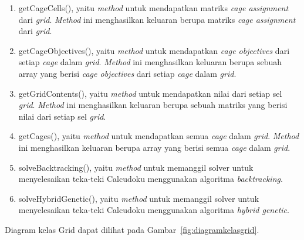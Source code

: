\begin{enumerate}
\item getCageCells(), yaitu \textit{method} untuk mendapatkan matriks \textit{cage assignment} dari \textit{grid}. \textit{Method} ini menghasilkan keluaran berupa matriks \textit{cage assignment} dari \textit{grid}.
\item getCageObjectives(), yaitu \textit{method} untuk mendapatkan \textit{cage objectives} dari setiap \textit{cage} dalam \textit{grid}. \textit{Method} ini menghasilkan keluaran berupa sebuah array yang berisi \textit{cage objectives} dari setiap \textit{cage} dalam \textit{grid}.
\item getGridContents(), yaitu \textit{method} untuk mendapatkan nilai dari setiap sel \textit{grid}. \textit{Method} ini menghasilkan keluaran berupa sebuah matriks yang berisi nilai dari setiap sel \textit{grid}.
\item getCages(), yaitu \textit{method} untuk mendapatkan semua \textit{cage} dalam \textit{grid}. \textit{Method} ini menghasilkan keluaran berupa array yang berisi semua \textit{cage} dalam \textit{grid}.
\item solveBacktracking(), yaitu \textit{method} untuk memanggil solver untuk menyelesaikan teka-teki Calcudoku menggunakan algoritma \textit{backtracking}. 
\item solveHybridGenetic(), yaitu \textit{method} untuk memanggil solver untuk menyelesaikan teka-teki Calcudoku menggunakan algoritma \textit{hybrid genetic}. 
\end{enumerate}

Diagram kelas Grid dapat dilihat pada Gambar~\ref{fig:diagramkelasgrid}.

